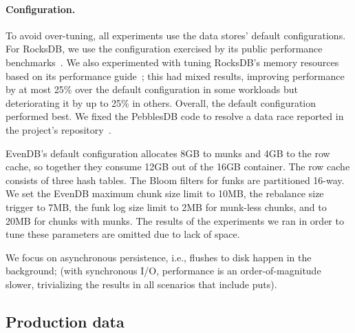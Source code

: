 \documentclass[sigplan,10pt]{acmart}
\newcommand{\sys}{EvenDB}
\begin{document}
\paragraph{Configuration.} 
To avoid over-tuning, all experiments use the data stores' default configurations. For RocksDB, we use the configuration exercised by its public 
performance benchmarks~\cite{RocksDBPerf}. 
We also experimented with tuning RocksDB's memory resources based on its performance guide~\cite{RocksDBMemoryTuning}; 
this had mixed results, improving performance by at most 25\% over the default configuration in some workloads but 
deteriorating it by up to 25\% in others. Overall, the default configuration performed best. 
We fixed the PebblesDB code to resolve a data race reported in the project's repository~\cite{pebbles-git-issue}. 

\sys's default configuration 
allocates 8GB to munks and 4GB to the row cache,
so together they consume 12GB out of the 16GB container. 
The row cache consists of three hash tables.  
The Bloom filters for funks are partitioned 16-way.  
We set the \sys\/ maximum chunk size limit to 10MB, the rebalance size trigger to 7MB, 
the funk log size limit to 2MB for munk-less chunks, and to 20MB for chunks with munks. 
The results of the experiments we ran in order to tune these parameters are omitted due to lack of space.

We focus on asynchronous persistence,  i.e., flushes to disk happen in the background; 
(with synchronous I/O, performance is an order-of-magnitude slower, trivializing the results 
in all scenarios that include puts). 

\subsection{Production data}
\label{ssec:prod}
\end{document}
